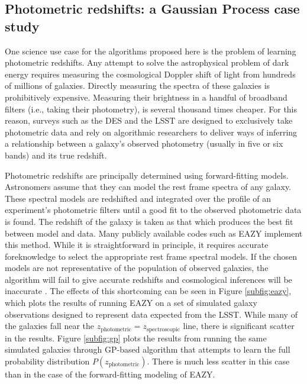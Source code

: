 \documentclass[useAMS,usenatbib,tightenlines,11pt,preprint]{aastex}
\begin{document}
\subsection{Photometric redshifts: a Gaussian Process case study}
\label{sec:photoz}

One science use case for the algorithms proposed here is the problem of learning
photometric redshifts.  Any attempt to solve the astrophysical problem of dark
energy requires measuring the cosmological Doppler shift of light from hundreds of
millions of galaxies.  Directly measuring the spectra of these galaxies is
prohibitively expensive.  Measuring their brightness in a handful of broadband
filters (i.e., taking their photometry), is several thousand times cheaper. 
For this reason, surveys such as the DES and the LSST are designed to exclusively take
photometric data and rely on algorithmic researchers to deliver ways
of inferring a relationship between a galaxy's observed photometry (usually in five or
six bands) and its true redshift.

Photometric redshifts are principally determined using
forward-fitting models.  Astronomers assume that they can model the rest frame
spectra of any galaxy.  These spectral models are
redshifted and integrated over the profile of an experiment's
photometric filters until a good fit to the observed photometric data is
found.  The redshift of the galaxy is taken as that which produces the best fit
between model and data.  Many publicly available codes such as 
EAZY \cite{eazy} implement this method.  
While it is straightforward in principle, it requires
accurate foreknowledge to select the appropriate rest frame 
spectral models.  If the chosen
models are not representative of the population of observed
galaxies, the algorithm will fail to give accurate redshifts and cosmological
inferences will be inaccurate \cite{budavari2008}.  The effects of this
shortcoming can be seen in Figure \ref{subfig:eazy}, which plots the results
of running EAZY on a set of
simulated galaxy observations designed to represent data expected from the
LSST.
While many of the galaxies fall near the
$z_\text{photometric}=z_\text{spectroscopic}$ line, there is significant scatter
in the results.  Figure \ref{subfig:gp} plots the results from running the same
simulated galaxies through GP-based algorithm that attempts to learn the full
probability distribution $P(z_\text{photometric})$.  There is much less scatter
in this case than in the case of the forward-fitting modeling of EAZY.
\end{document}
